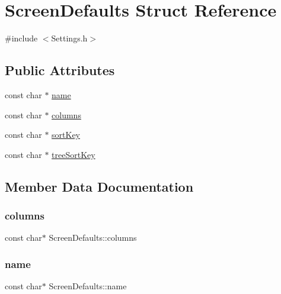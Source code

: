 \hypertarget{structScreenDefaults}{}\section{Screen\+Defaults Struct Reference}
\label{structScreenDefaults}


{\ttfamily \#include $<$Settings.\+h$>$}

\subsection*{Public Attributes}
\begin{DoxyCompactItemize}
\item 
const char $\ast$ \hyperlink{structScreenDefaults_a05e5428387c652a4c7132d9e597edd59}{name}
\item 
const char $\ast$ \hyperlink{structScreenDefaults_a669cf2797688fd511b6d6ad9c439920a}{columns}
\item 
const char $\ast$ \hyperlink{structScreenDefaults_a9d97c3f22fecadae09617ccee6b2a916}{sort\+Key}
\item 
const char $\ast$ \hyperlink{structScreenDefaults_af74a01c927b7bf683d35bd3e9bb6c99a}{tree\+Sort\+Key}
\end{DoxyCompactItemize}


\subsection{Member Data Documentation}
\mbox{\label{structScreenDefaults_a669cf2797688fd511b6d6ad9c439920a}} 
\subsubsection{\texorpdfstring{columns}{columns}}
{\footnotesize\ttfamily const char$\ast$ Screen\+Defaults\+::columns}

\mbox{\label{structScreenDefaults_a05e5428387c652a4c7132d9e597edd59}} 
\subsubsection{\texorpdfstring{name}{name}}
{\footnotesize\ttfamily const char$\ast$ Screen\+Defaults\+::name}

